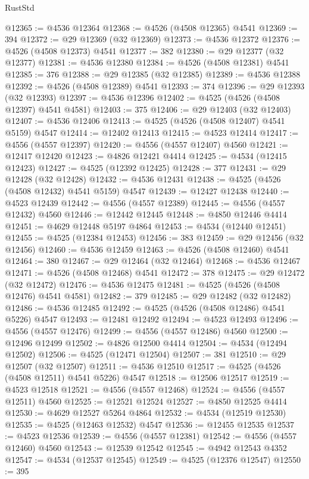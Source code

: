 \begin{lexlean}{RustStd}
\begin{coremodule}
{\begin{coremodule}
{{{{{{{{{{{{{{{{{{{{{{{{{{{{{{{{{{{{{{{{{{{{{{{{{{{{{{{@12365 := @4536 @12364
@12368 := @4526 (@4508 @12365) @4541
@12369 := 394
@12372 := @29 @12369 (@32 @12369)
@12373 := @4536 @12372
@12376 := @4526 (@4508 @12373) @4541
@12377 := 382
@12380 := @29 @12377 (@32 @12377)
@12381 := @4536 @12380
@12384 := @4526 (@4508 @12381) @4541
@12385 := 376
@12388 := @29 @12385 (@32 @12385)
@12389 := @4536 @12388
@12392 := @4526 (@4508 @12389) @4541
@12393 := 374
@12396 := @29 @12393 (@32 @12393)
@12397 := @4536 @12396
@12402 := @4525 (@4526 (@4508 @12397) @4541 @4581)
@12403 := 375
@12406 := @29 @12403 (@32 @12403)
@12407 := @4536 @12406
@12413 := @4525 (@4526 (@4508 @12407) @4541 @5159) @4547
@12414 := @12402 @12413
@12415 := @4523 @12414
@12417 := @4556 (@4557 @12397)
@12420 := @4556 (@4557 @12407) @4560
@12421 := @12417 @12420
@12423 := @4826 @12421 @4414
@12425 := @4534 (@12415 @12423)
@12427 := @4525 (@12392 @12425)
@12428 := 377
@12431 := @29 @12428 (@32 @12428)
@12432 := @4536 @12431
@12438 := @4525 (@4526 (@4508 @12432) @4541 @5159) @4547
@12439 := @12427 @12438
@12440 := @4523 @12439
@12442 := @4556 (@4557 @12389)
@12445 := @4556 (@4557 @12432) @4560
@12446 := @12442 @12445
@12448 := @4850 @12446 @4414
@12451 := @4629 @12448 @5197 @4864
@12453 := @4534 (@12440 @12451)
@12455 := @4525 (@12384 @12453)
@12456 := 383
@12459 := @29 @12456 (@32 @12456)
@12460 := @4536 @12459
@12463 := @4526 (@4508 @12460) @4541
@12464 := 380
@12467 := @29 @12464 (@32 @12464)
@12468 := @4536 @12467
@12471 := @4526 (@4508 @12468) @4541
@12472 := 378
@12475 := @29 @12472 (@32 @12472)
@12476 := @4536 @12475
@12481 := @4525 (@4526 (@4508 @12476) @4541 @4581)
@12482 := 379
@12485 := @29 @12482 (@32 @12482)
@12486 := @4536 @12485
@12492 := @4525 (@4526 (@4508 @12486) @4541 @5226) @4547
@12493 := @12481 @12492
@12494 := @4523 @12493
@12496 := @4556 (@4557 @12476)
@12499 := @4556 (@4557 @12486) @4560
@12500 := @12496 @12499
@12502 := @4826 @12500 @4414
@12504 := @4534 (@12494 @12502)
@12506 := @4525 (@12471 @12504)
@12507 := 381
@12510 := @29 @12507 (@32 @12507)
@12511 := @4536 @12510
@12517 := @4525 (@4526 (@4508 @12511) @4541 @5226) @4547
@12518 := @12506 @12517
@12519 := @4523 @12518
@12521 := @4556 (@4557 @12468)
@12524 := @4556 (@4557 @12511) @4560
@12525 := @12521 @12524
@12527 := @4850 @12525 @4414
@12530 := @4629 @12527 @5264 @4864
@12532 := @4534 (@12519 @12530)
@12535 := @4525 (@12463 @12532) @4547
@12536 := @12455 @12535
@12537 := @4523 @12536
@12539 := @4556 (@4557 @12381)
@12542 := @4556 (@4557 @12460) @4560
@12543 := @12539 @12542
@12545 := @4942 @12543 @4352
@12547 := @4534 (@12537 @12545)
@12549 := @4525 (@12376 @12547)
@12550 := 395
}}}}}}}}}}}}}}}}}}}}}}}}}}}}}}}}}}}}}}}}}}}}}}}}}}}}}}}
\end{coremodule}}
\end{coremodule}
\end{lexlean}
